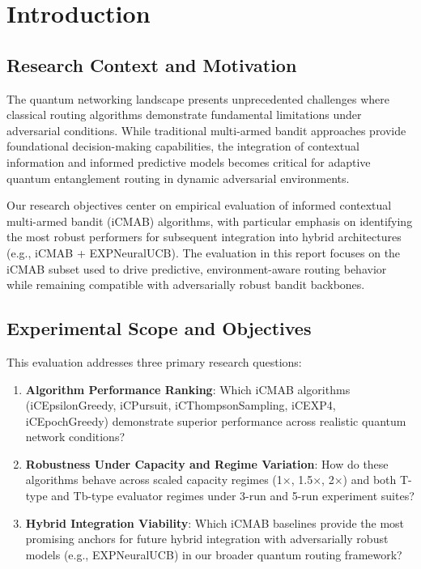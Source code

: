 \documentclass[12pt,a4paper]{article}
\begin{document}
\newpage
\section{Introduction}

\subsection{Research Context and Motivation}

The quantum networking landscape presents unprecedented challenges where classical routing algorithms demonstrate fundamental limitations under adversarial conditions. While traditional multi-armed bandit approaches provide foundational decision-making capabilities, the integration of contextual information and informed predictive models becomes critical for adaptive quantum entanglement routing in dynamic adversarial environments.

Our research objectives center on empirical evaluation of informed contextual multi-armed bandit (iCMAB) algorithms, with particular emphasis on identifying the most robust performers for subsequent integration into hybrid architectures (e.g., iCMAB + EXPNeuralUCB). The evaluation in this report focuses on the iCMAB subset used to drive predictive, environment-aware routing behavior while remaining compatible with adversarially robust bandit backbones.

\subsection{Experimental Scope and Objectives}

This evaluation addresses three primary research questions:

\begin{enumerate}
\item \textbf{Algorithm Performance Ranking}: Which iCMAB algorithms (iCEpsilonGreedy, iCPursuit, iCThompsonSampling, iCEXP4, iCEpochGreedy) demonstrate superior performance across realistic quantum network conditions?
\item \textbf{Robustness Under Capacity and Regime Variation}: How do these algorithms behave across scaled capacity regimes (1$\times$, 1.5$\times$, 2$\times$) and both T-type and Tb-type evaluator regimes under 3-run and 5-run experiment suites?
\item \textbf{Hybrid Integration Viability}: Which iCMAB baselines provide the most promising anchors for future hybrid integration with adversarially robust models (e.g., EXPNeuralUCB) in our broader quantum routing framework?
\end{enumerate}
\end{document}
